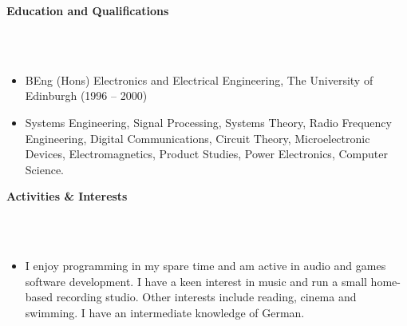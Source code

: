 \documentclass[a4paper,10pt]{article}
\newcommand{\lsep}{-0.5cm}
\newcommand{\resheading}[1]{{\small \colorbox{mygrey}{\begin{minipage}{0.975\textwidth}{\textbf{#1 \vphantom{p\^{E}}}}\end{minipage}}}}
\begin{document}
\resheading{\textbf{Education and Qualifications} }\\[\lsep]
\\
\begin{itemize}
  \item[] BEng (Hons) Electronics and Electrical Engineering, The University of Edinburgh (1996 – 2000)
\item[] Systems Engineering, Signal Processing, Systems Theory, Radio Frequency
  Engineering, Digital Communications, Circuit Theory, Microelectronic Devices,
    Electromagnetics, Product Studies, Power Electronics, Computer Science.
\\
\end{itemize}

\resheading{\textbf{Activities \& Interests} }\\[\lsep]
\\
\begin{itemize}
\item[] I enjoy programming in my spare time and am active in audio and games
  software development. I have a keen interest in music and run a small
    home-based recording studio. Other interests include reading, cinema and
    swimming. I have an intermediate knowledge of German.
\\
\end{itemize}
\end{document}
